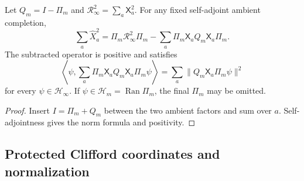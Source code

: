 \documentclass[12pt,a4paper]{article}
\begin{document}
\begin{proposition}
\label{p2:prop:extended-coordinate-compression-identity}
Let \(Q_m=I-\Pi_m\) and
\(\mathcal R_\infty^2=\sum_a\mathsf X_a^2\).  For any fixed self-adjoint
ambient completion,
\begin{equation}
\label{p2:eq:extended-coordinate-compression-identity}
\sum_a\widehat X_a^2
=
\Pi_m\mathcal R_\infty^2\Pi_m
-
\sum_a\Pi_m\mathsf X_aQ_m\mathsf X_a\Pi_m.
\end{equation}
The subtracted operator is positive and satisfies
\begin{equation}
\label{p2:eq:extended-coordinate-leakage-norm}
\left\langle\psi,
\sum_a\Pi_m\mathsf X_aQ_m\mathsf X_a\Pi_m\psi
\right\rangle
=
\sum_a\|Q_m\mathsf X_a\Pi_m\psi\|^2
\end{equation}
for every \(\psi\in\mathcal H_\infty\).  If
\(\psi\in\mathcal H_m=\operatorname{Ran}\Pi_m\), the final \(\Pi_m\) may be
omitted.
\end{proposition}

\begin{proof}
Insert \(I=\Pi_m+Q_m\) between the two ambient factors and sum over \(a\).
Self-adjointness gives the norm formula and positivity.
\end{proof}

\subsection{Protected Clifford coordinates and normalization}
\end{document}
